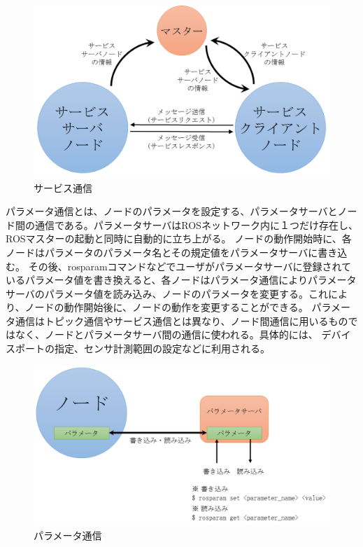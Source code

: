 \begin{figure}[htp]
  \centering
  \includegraphics[width=\columnwidth]{pictures/chapter6/pic_06_03.png}
  \caption{サービス通信}
\end{figure}

\begin{definition*}
パラメータ通信とは、ノードのパラメータを設定する、パラメータサーバとノード間の通信である。パラメータサーバはROSネットワーク内に１つだけ存在し、ROSマスターの起動と同時に自動的に立ち上がる。  ノードの動作開始時に、各ノードはパラメータのパラメータ名とその規定値をパラメータサーバに書き込む。  その後、rosparamコマンドなどでユーザがパラメータサーバに登録されているパラメータ値を書き換えると、各ノードはパラメータ通信によりパラメータサーバのパラメータ値を読み込み、ノードのパラメータを変更する。これにより、ノードの動作開始後に、ノードの動作を変更することができる。
パラメータ通信はトピック通信やサービス通信とは異なり、ノード間通信に用いるものではなく、ノードとパラメータサーバ間の通信に使われる。具体的には、  デバイスポートの指定、センサ計測範囲の設定などに利用される。
\end{definition*}

\begin{figure}[htp]
  \centering
  \includegraphics[width=\columnwidth]{pictures/chapter6/pic_06_04.png}
  \caption{パラメータ通信}
\end{figure}

